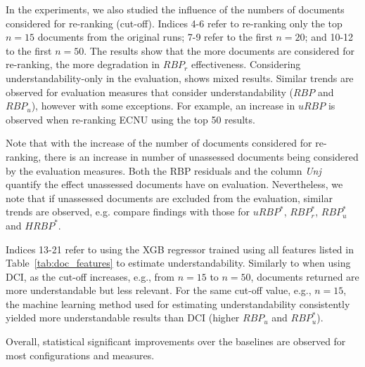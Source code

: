 In the experiments, we also studied the influence of the numbers of documents considered for re-ranking (cut-off). Indices 4-6 refer to re-ranking only the top $n=15$ documents from the original runs; 7-9 refer to the first $n=20$; and 10-12 to the first $n=50$. The results show that the more documents are considered for re-ranking, the more degradation in $RBP_r$ effectiveness. Considering understandability-only in the evaluation, shows mixed results. Similar trends are observed for evaluation measures that consider understandability ($RBP$ and $RBP_u$), however with some exceptions. For example, an increase in $uRBP$ is observed when re-ranking ECNU using the top 50 results. 

Note that with the increase of the number of documents considered for re-ranking, there is an increase in number of unassessed documents being considered by the evaluation measures. Both the RBP residuals and the column \textit{Unj} quantify the effect unassessed documents have on evaluation. Nevertheless, we note that if unassessed documents are excluded from the evaluation, similar trends are observed, e.g. compare findings with those for $uRBP^*$, $RBP_r^*$, $RBP_u^*$ and $HRBP^*$.


Indices 13-21 refer to using the XGB regressor trained using all features listed in Table~\ref{tab:doc_features} to estimate understandability. Similarly to when using DCI, as the cut-off increases, e.g., from $n=15$ to $n=50$, documents returned are more understandable but less relevant. For the same cut-off value, e.g., $n=15$, the machine learning method used for estimating understandability consistently yielded more understandable results than DCI (higher $RBP_u$ and $RBP_u^*$). 

Overall, statistical significant improvements over the baselines are observed for most configurations and measures.  


